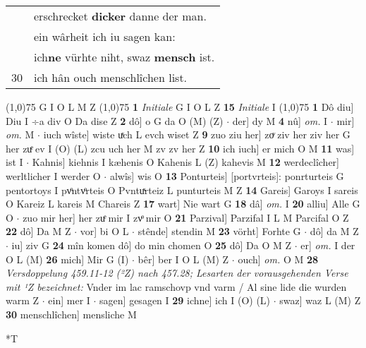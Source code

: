 \documentclass[8pt,a4paper,notitlepage]{article}
\begin{document}
\begin{table}[ht]
\begin{minipage}[t]{0.5\linewidth}
\begin{tabular}{rl}
 & erschrecket \textbf{dicker} danne der man.\\ 
 & ein wârheit ich iu sagen kan:\\ 
 & ich\textbf{ne} vürhte niht, swaz \textbf{mensch} ist.\\ 
30 & ich hân ouch menschlîchen list.\\ 
\end{tabular}
\scriptsize
\line(1,0){75} \newline
G I O L M Z \newline
\line(1,0){75} \newline
\textbf{1} \textit{Initiale} G I O L Z  \textbf{15} \textit{Initiale} I  \newline
\line(1,0){75} \newline
\textbf{1} Dô diu] Diu I ÷a div O Da dise Z \textbf{2} dô] o G da O (M) (Z)  $\cdot$ der] dy M \textbf{4} nû] \textit{om.} I  $\cdot$ mir] \textit{om.} M  $\cdot$ iuch wîste] wiste uͯch L evch wiset Z \textbf{9} zuo ziu her] zoͮ ziv her ziv her G her zuͤ ev I (O) (L) zcu uch her M zv zv her Z \textbf{10} ich iuch] er mich O M \textbf{11} was] ist I  $\cdot$ Kahnis] kiehnis I kæhenis O Kahenis L (Z) kahevis M \textbf{12} werdeclîcher] werltlicher I werder O  $\cdot$ alwîs] wis O \textbf{13} Ponturteis] [portvrteis]: ponrturteis G pentortoys I pvͦntvͦrteis O Pvntuͯrteiz L punturteis M Z \textbf{14} Gareis] Garoys I sareis O Kareiz L kareis M Chareis Z \textbf{17} wart] Nie wart G \textbf{18} dâ] \textit{om.} I \textbf{20} alliu] Alle G O  $\cdot$ zuo mir her] her zuͤ mir I zvͦ mir O \textbf{21} Parzival] Parzifal I L M Parcifal O Z \textbf{22} dô] Da M Z  $\cdot$ vor] bi O L  $\cdot$ stênde] stendin M \textbf{23} vörht] Forhte G  $\cdot$ dô] da M Z  $\cdot$ iu] ziv G \textbf{24} mîn komen dô] do min chomen O \textbf{25} dô] Da O M Z  $\cdot$ er] \textit{om.} I der O L (M) \textbf{26} mich] Mir G (I)  $\cdot$ bêr] ber I O L (M) Z  $\cdot$ ouch] \textit{om.} O M \textbf{28} \textit{Versdoppelung 459.11-12 (²Z) nach 457.28; Lesarten der vorausgehenden Verse mit ¹Z bezeichnet:} Vnder im lac ramschovp vnd varm / Al sine lide die wurden warm Z   $\cdot$ ein] mer I  $\cdot$ sagen] gesagen I \textbf{29} ichne] ich I (O) (L)  $\cdot$ swaz] waz L (M) Z \textbf{30} menschlîchen] mensliche M \newline
\end{minipage}
\hspace{0.5cm}
\begin{minipage}[t]{0.5\linewidth}
\small
\begin{center}*T
\end{center}

\end{minipage}
\end{table}
\end{document}
